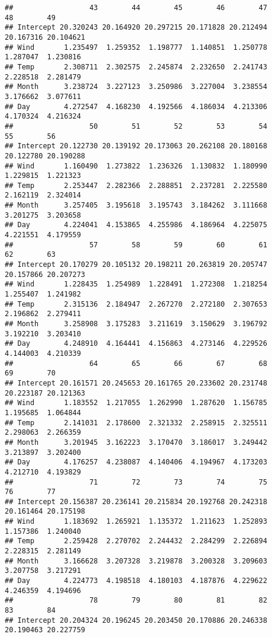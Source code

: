 \documentclass[
]{article}
\begin{document}
\begin{verbatim}
##                  43        44        45        46        47        48        49
## Intercept 20.320243 20.164920 20.297215 20.171828 20.212494 20.167316 20.104621
## Wind       1.235497  1.259352  1.198777  1.140851  1.250778  1.287047  1.230816
## Temp       2.308711  2.302575  2.245874  2.232650  2.241743  2.228518  2.281479
## Month      3.238724  3.227123  3.250986  3.227004  3.238554  3.176662  3.077611
## Day        4.272547  4.168230  4.192566  4.186034  4.213306  4.170324  4.216324
##                  50        51        52        53        54        55        56
## Intercept 20.122730 20.139192 20.173063 20.262108 20.180168 20.122780 20.190288
## Wind       1.160490  1.273822  1.236326  1.130832  1.180990  1.229815  1.221323
## Temp       2.253447  2.282366  2.288851  2.237281  2.225580  2.162119  2.324014
## Month      3.257405  3.195618  3.195743  3.184262  3.111668  3.201275  3.203658
## Day        4.224041  4.153865  4.255986  4.186964  4.225075  4.221551  4.179559
##                  57        58        59        60        61        62        63
## Intercept 20.170279 20.105132 20.198211 20.263819 20.205747 20.157866 20.207273
## Wind       1.228435  1.254989  1.228491  1.272308  1.218254  1.255407  1.241982
## Temp       2.315136  2.184947  2.267270  2.272180  2.307653  2.196862  2.279411
## Month      3.258908  3.175283  3.211619  3.150629  3.196792  3.192210  3.203410
## Day        4.248910  4.164441  4.156863  4.273146  4.229526  4.144003  4.210339
##                  64        65        66        67        68        69        70
## Intercept 20.161571 20.245653 20.161765 20.233602 20.231748 20.223187 20.121363
## Wind       1.183552  1.217055  1.262990  1.287620  1.156785  1.195685  1.064844
## Temp       2.141031  2.178600  2.321332  2.258915  2.325511  2.298063  2.266359
## Month      3.201945  3.162223  3.170470  3.186017  3.249442  3.213897  3.202400
## Day        4.176257  4.238087  4.140406  4.194967  4.173203  4.212710  4.193829
##                  71        72        73        74        75        76        77
## Intercept 20.156387 20.236141 20.215834 20.192768 20.242318 20.161464 20.175198
## Wind       1.183692  1.265921  1.135372  1.211623  1.252893  1.157386  1.240040
## Temp       2.259428  2.270702  2.244432  2.284299  2.226894  2.228315  2.281149
## Month      3.166628  3.207328  3.219878  3.200328  3.209603  3.207758  3.217291
## Day        4.224773  4.198518  4.180103  4.187876  4.229622  4.246359  4.194696
##                  78        79        80        81        82        83        84
## Intercept 20.204324 20.196245 20.203450 20.170886 20.246338 20.190463 20.227759

\end{verbatim}
\end{document}
